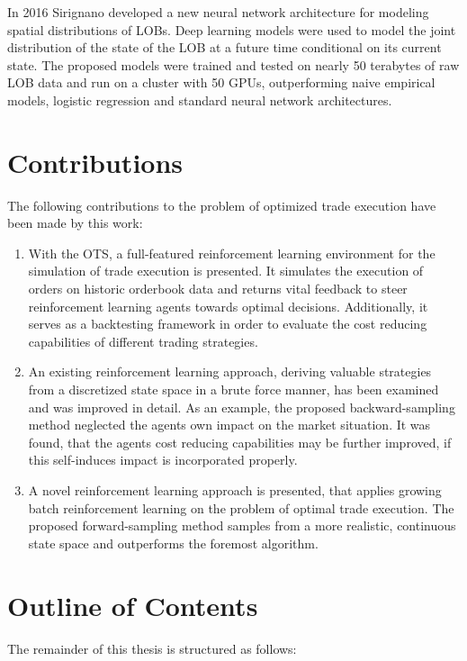 In 2016 Sirignano \Cite{2016arXiv160101987S} developed a new neural network architecture for modeling spatial distributions of \ac{LOB}s. Deep learning models were used to model the joint distribution of the state of the \ac{LOB} at a future time conditional on its current state. The proposed models were trained and tested on nearly 50 terabytes of raw \ac{LOB} data and run on a cluster with 50 GPUs, outperforming naive empirical models, logistic regression and standard neural network architectures.




\section{Contributions}
\label{sec:contributions}
The following contributions to the problem of optimized trade execution have been made by this work:
\begin{enumerate}
\item With the \ac{OTS}, a full-featured reinforcement learning environment for the simulation of trade execution is presented. It simulates the execution of orders on historic orderbook data and returns vital feedback to steer reinforcement learning agents towards optimal decisions. Additionally, it serves as a backtesting framework in order to evaluate the cost reducing capabilities of different trading strategies.

\item An existing reinforcement learning approach, deriving valuable strategies from a discretized state space in a brute force manner, has been examined and was improved in detail. As an example, the proposed backward-sampling method neglected the agents own impact on the market situation. It was found, that the agents cost reducing capabilities may be further improved, if this self-induces impact is incorporated properly.

\item A novel reinforcement learning approach is presented, that applies growing batch reinforcement learning on the problem of optimal trade execution. The proposed forward-sampling method samples from a more realistic, continuous state space and outperforms the foremost algorithm.

\end{enumerate}

\section{Outline of Contents}
\label{sec:outline}
The remainder of this thesis is structured as follows:

